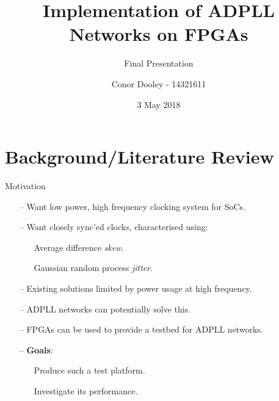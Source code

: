 \documentclass{beamer}
\title{Implementation of ADPLL Networks on FPGAs}
\author{Conor Dooley - 14321611}%
\subtitle{Final Presentation}
\date{3 May 2018}
\institute{Supervisors: B. Mulkeen \& Dr. E. Blokhina}
\begin{document}
\begin{frame}
    \titlepage
\end{frame}

\section*{Background/Literature Review}
\begin{frame}{Motivation}
    \begin{itemize}
        \item[--]
        	Want low power, high frequency clocking system for SoCs.
        \item[--]
            Want closely sync'ed clocks, characterised using:
    		\begin{itemize}
    			\item[]
    				Average difference \textit{skew}.
    			\item[]
	    			Gaussian random process \textit{jitter}.
    		\end{itemize}
    	\item[--]
    		Existing solutions limited by power usage at high frequency.
    	\item[--]
    		ADPLL networks can potentially solve this.
    	\item[--]
    		FPGAs can be used to provide a testbed for ADPLL networks.
    	\item[--]
    		\textbf{Goals}:
    		\begin{itemize}
    			\item[]
    			 Produce such a test platform.
    			\item[]
    				Investigate its performance.
    		\end{itemize}
    	
    \end{itemize}
\end{frame}
\end{document}

